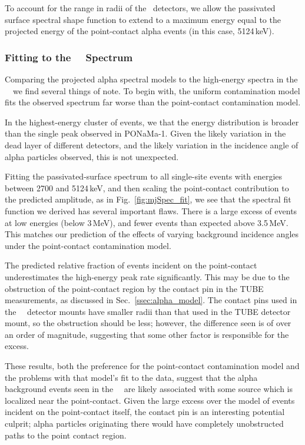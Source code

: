 To account for the range in radii of the \MJ\ detectors, we allow the passivated surface spectral shape function to extend to a maximum energy equal to the projected energy of the point-contact alpha events (in this case, 5124\,keV). 

\subsubsection{Fitting to the \MJ\ \DEM\ Spectrum}
Comparing the projected alpha spectral models to the high-energy spectra in the \MJ\ \DEM\, we find several things of note. To begin with, the uniform contamination model fits the observed spectrum far worse than the point-contact contamination model. 

In the highest-energy cluster of events, we that the energy distribution is broader than the single peak observed in PONaMa-1. Given the likely variation in the dead layer of different detectors, and the likely variation in the incidence angle of alpha particles observed, this is not unexpected. 

Fitting the passivated-surface spectrum to all single-site events with energies between 2700 and 5124\,keV, and then scaling the point-contact contribution to the predicted amplitude, as in Fig.~\ref{fig:mjSpec_fit}, we see that the spectral fit function we derived has several important flaws. There is a large excess of events at low energies (below 3\,MeV), and fewer events than expected above 3.5\,MeV. This matches our prediction of the effects of varying background incidence angles under the point-contact contamination model. 

The predicted relative fraction of events incident on the point-contact underestimates the high-energy peak rate significantly. This may be due to the obstruction of the point-contact region by the contact pin in the TUBE measurements, as discussed in Sec.~\ref{ssec:alpha_model}. The contact pins used in the \MJ\ \DEM\ detector mounts have smaller radii than that used in the TUBE detector mount, so the obstruction should be less; however, the difference seen is of over an order of magnitude, suggesting that some other factor is responsible for the excess.

These results, both the preference for the point-contact contamination model and the problems with that model's fit to the data, suggest that the alpha background events seen in the \MJ\ \DEM\ are likely associated with some source which is localized near the point-contact. Given the large excess over the model of events incident on the point-contact itself, the contact pin is an interesting potential culprit; alpha particles originating there would have completely unobstructed paths to the point contact region. 


